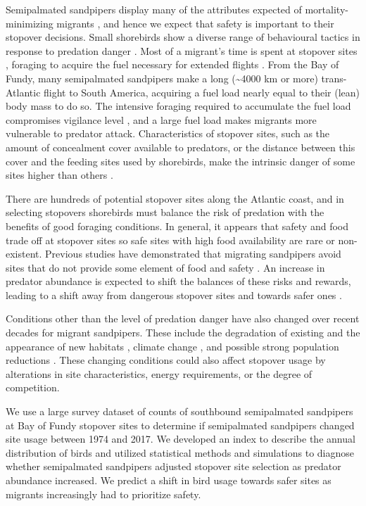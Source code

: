 Semipalmated sandpipers display many of the attributes expected of mortality-minimizing migrants \citep{Hope2011,Duijns2019}, and hence we expect that safety is important to their stopover decisions. Small shorebirds show a diverse range of behavioural tactics in response to predation danger \citep[e.g.,][and references therein]{lank_effects_2003,Sprague2008a,Pomeroy2008a,Fernandez2010c,beauchamp2010ethology,hilton1999choice,martins2016contrasting,ydenberg_western_2004,VandenHout2010,VandenHout2016,Cresswell2013}. Most of a migrant's time is spent at stopover sites \citep{Hedenstrom1997}, foraging to acquire the fuel necessary for extended flights \citep{Houston1998,Cimprich2005a}. From the Bay of Fundy, many semipalmated sandpipers make a long (\textasciitilde4000 km or more) trans-Atlantic flight to South America, acquiring a fuel load nearly equal to their (lean) body mass to do so. The intensive foraging required to accumulate the fuel load compromises vigilance level \citep{Beauchamp2014}, and a large fuel load makes migrants more vulnerable to predator attack. Characteristics of stopover sites, such as the amount of concealment cover available to predators, or the distance between this cover and the feeding sites used by shorebirds, make the intrinsic danger of some sites higher than others \citep{lank_ydenberg2003}. 

There are hundreds of potential stopover sites along the Atlantic coast, and in selecting stopovers shorebirds must balance the risk of predation with the benefits of good foraging conditions. In general, it appears that safety and food trade off at stopover sites so safe sites with high food availability are rare or non-existent. Previous studies have demonstrated that migrating sandpipers avoid sites that do not provide some element of food and safety \citep{Sprague2008a,Pomeroy2008a}. An increase in predator abundance is expected to shift the balances of these risks and rewards, leading to a shift away from dangerous stopover sites and towards safer ones \citep{Hope2018a}. 

Conditions other than the level of predation danger have also changed over recent decades for migrant sandpipers. These include the degradation of existing and the appearance of new habitats \citep{Iwamura2013,Studds2017,Taft2006a,Alves2012}, climate change \citep{Both2007,Gordo2007,cox2010bird,Sutherland2015,Mann2017}, and possible strong population reductions \citep{munro2017s,rosenberg2019decline}. These changing conditions could also affect stopover usage by alterations in site characteristics, energy requirements, or the degree of competition. 

We use a large survey dataset of counts of southbound semipalmated sandpipers at Bay of Fundy stopover sites to determine if semipalmated sandpipers changed site usage between 1974 and 2017. We developed an index to describe the annual distribution of birds and utilized statistical methods and simulations to diagnose whether semipalmated sandpipers adjusted stopover site selection as predator abundance increased. We predict a shift in bird usage towards safer sites as migrants increasingly had to prioritize safety. 
